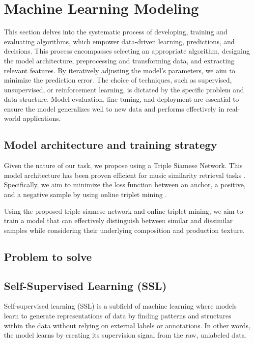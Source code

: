 \section{Machine Learning Modeling}

This section delves into the systematic process of developing, training and evaluating algorithms, which empower data-driven learning, predictions, and decisions. This process encompasses selecting an appropriate algorithm, designing the model architecture, preprocessing and transforming data, and extracting relevant features. By iteratively adjusting the model's parameters, we aim to minimize the prediction error. The choice of techniques, such as supervised, unsupervised, or reinforcement learning, is dictated by the specific problem and data structure. Model evaluation, fine-tuning, and deployment are essential to ensure the model generalizes well to new data and performs effectively in real-world applications.


\subsection{Model architecture and training strategy}

Given the nature of our task, we propose using a Triple Siamese Network. This model architecture has been proven efficient for music similarity retrieval tasks \cite{contentmusicsimtriplet2020}. Specifically, we aim to minimize the loss function between an anchor, a positive, and a negative sample by using online triplet mining \cite{Sikaroudi2020OfflinePatches}.

Using the proposed triple siamese network and online triplet mining, we aim to train a model that can effectively distinguish between similar and dissimilar samples while considering their underlying composition and production texture.

\subsection{Problem to solve}

\subsection{Self-Supervised Learning (SSL)}

Self-supervised learning (SSL) is a subfield of machine learning where models learn to generate representations of data by finding patterns and structures within the data without relying on external labels or annotations. In other words, the model learns by creating its supervision signal from the raw, unlabeled data.\cite{audioselfsupsurvey}

